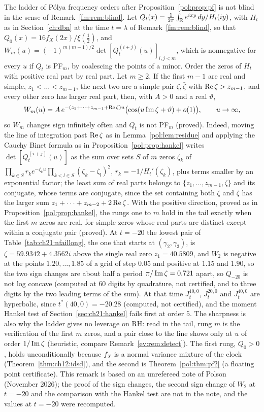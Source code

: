 \begin{remark}\label{fm:rem:pfladder}
The ladder of P\'olya frequency orders after Proposition~\ref{pol:prop:pf} is not blind in the sense of Remark~\ref{fm:rem:blind}. Let $Q_t(x)=\frac1{2\pi}\int_{\mathbb{R}} e^{ixy}\,dy/H_t(iy)$, with $H_t$ as in Section~\ref{ch:dbn} at the time $t=\lambda$ of Remark~\ref{fm:rem:blind}, so that $Q_0(x)=16f_X(2x)/\xi(\frac12)$, and $W_m(u)=(-1)^{m(m-1)/2}\det[Q_t^{(i+j)}(u)]_{i,j<m}$, which is nonnegative for every $u$ if $Q_t$ is PF$_m$, by coalescing the points of a minor. Order the zeros of $H_t$ with positive real part by real part. Let $m\ge2$. If the first $m-1$ are real and simple, $z_1<\dots<z_{m-1}$, the next two are a simple pair $\zeta,\bar\zeta$ with $\operatorname{Re}\zeta>z_{m-1}$, and every other zero has larger real part, then, with $A>0$ and a real $\vartheta$,
\[
W_m(u)=A\,e^{-(z_1+\dots+z_{m-1}+\operatorname{Re}\zeta)u}\bigl(\cos(u\operatorname{Im}\zeta+\vartheta)+o(1)\bigr),\qquad u\to\infty,
\]
so $W_m$ changes sign infinitely often and $Q_t$ is not PF$_m$ (proved). Indeed, moving the line of integration past $\operatorname{Re}\zeta$ as in Lemma~\ref{pol:lem:residue} and applying the Cauchy Binet formula as in Proposition~\ref{pol:prop:hankel} writes $\det[Q_t^{(i+j)}(u)]$ as the sum over sets $S$ of $m$ zeros $\zeta_k$ of $\prod_{k\in S}r_ke^{-\zeta_ku}\prod_{k<l\in S}(\zeta_k-\zeta_l)^2$, $r_k=-1/H_t'(\zeta_k)$, plus terms smaller by an exponential factor; the least sum of real parts belongs to $\{z_1,\dots,z_{m-1},\zeta\}$ and its conjugate, whose terms are conjugate, since the set containing both $\zeta$ and $\bar\zeta$ has the larger sum $z_1+\dots+z_{m-2}+2\operatorname{Re}\zeta$. With the positive direction, proved as in Proposition~\ref{pol:prop:hankel}, the rungs one to $m$ hold in the tail exactly when the first $m$ zeros are real, for simple zeros whose real parts are distinct except within a conjugate pair (proved). At $t=-20$ the lowest pair of Table~\ref{tab:ch21:nfaillong}, the one that starts at $(\gamma_2,\gamma_3)$, is $\zeta=59.9342+4.3562i$ above the single real zero $z_1=40.5809$, and $W_2$ is negative at the points $1.20,\dots,1.85$ of a grid of step $0.05$ and positive at $1.15$ and $1.90$, so the two sign changes are about half a period $\pi/\operatorname{Im}\zeta=0.721$ apart, so $Q_{-20}$ is not log concave (computed at $60$ digits by quadrature, not certified, and to three digits by the two leading terms of the sum). At that time $J_t^{10,0}$, $J_t^{20,0}$ and $J_t^{40,0}$ are hyperbolic, since $t^*(40,0)=-20.28$ (computed, not certified), and the moment Hankel test of Section~\ref{sec:ch21:hankel} fails first at order $5$. The sharpness is also why the ladder gives no leverage on RH: read in the tail, rung $m$ is the verification of the first $m$ zeros, and a pair close to the line shows only at $u$ of order $1/\operatorname{Im}\zeta$ (heuristic, compare Remark~\ref{ev:rem:detect}). The first rung, $Q_0>0$, holds unconditionally because $f_X$ is a normal variance mixture of the clock (Theorem~\ref{thm:ch12:idsd}), and the second is Theorem~\ref{pol:thm:pf2} (a floating point certificate). This remark is based on an unrefereed note of Polson (November 2026); the proof of the sign changes, the second sign change of $W_2$ at $t=-20$ and the comparison with the Hankel test are not in the note, and the values at $t=-20$ were recomputed.

\end{remark}
